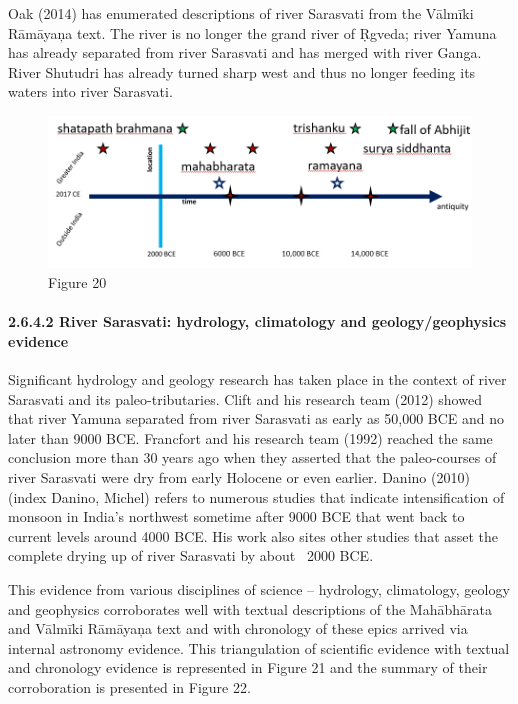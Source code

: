 Oak (2014) has enumerated descriptions of river Sarasvati from the Vālmīki Rāmāyaņa text. The river is no longer the grand river of Ṛgveda; river Yamuna has already separated from river Sarasvati and has merged with river Ganga. River Shutudri has already turned sharp west and thus no longer feeding its waters into river Sarasvati.

\begin{figure}
\includegraphics{"images/8-20.jpg"}
\caption{Figure 20}
\end{figure}


\paragraph{2.6.4.2 River Sarasvati: hydrology, climatology and geology/geophysics evidence}

Significant hydrology and geology research has taken place in the context of river Sarasvati and its paleo-tributaries. Clift and his research team (2012) showed that river Yamuna separated from river Sarasvati as early as 50,000 BCE and no later than 9000 BCE. Francfort and his research team (1992) reached the same conclusion more than 30 years ago when they asserted that the paleo-courses of river Sarasvati were dry from early Holocene or even earlier. Danino (2010) (index Danino, Michel) refers to numerous studies that indicate intensification of monsoon in India’s northwest sometime after 9000 BCE that went back to current levels around 4000 BCE. His work also sites other studies that asset the complete drying up of river Sarasvati by about ~2000 BCE.

This evidence from various disciplines of science – hydrology, climatology, geology and geophysics corroborates well with textual descriptions of the Mahābhārata and Vālmīki Rāmāyaņa text and with chronology of these epics arrived via internal astronomy evidence. This triangulation of scientific evidence with textual and chronology evidence is represented in Figure 21 and the summary of their corroboration is presented in Figure 22.

